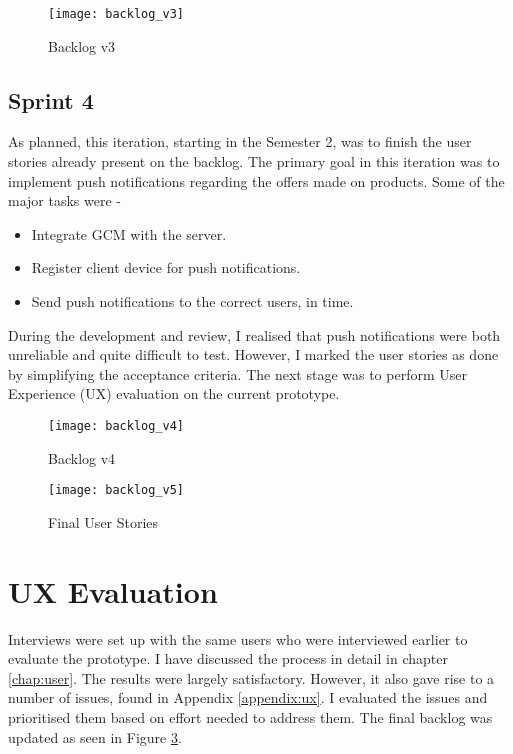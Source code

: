 \begin{figure}[!h]
    \centering
    \texttt{[image: backlog\_v3]}
    \caption{Backlog v3}\label{fig:backlog-v3}
\end{figure}

\subsection{Sprint 4}

As planned, this iteration, starting in the Semester 2, was to finish the user stories already present on the backlog. The primary goal in this iteration was to implement push notifications regarding the offers made on products. Some of the major tasks were - 

\begin{itemize}
	\item Integrate GCM with the server.
	\item Register client device for push notifications.
	\item Send push notifications to the correct users, in time.
\end{itemize}

During the development and review, I realised that push notifications were both unreliable and quite difficult to test. However, I marked the user stories as done by simplifying the acceptance criteria. The next stage was to perform User Experience (UX) evaluation on the current prototype.

\begin{figure}[!h]
    \centering
    \texttt{[image: backlog\_v4]}
    \caption{Backlog v4}\label{fig:backlog-v4}
\end{figure}

\begin{figure}[!h]
    \centering
    \texttt{[image: backlog\_v5]}
    \caption{Final User Stories}\label{fig:backlog-v5}
\end{figure}

\section{UX Evaluation}

Interviews were set up with the same users who were interviewed earlier to evaluate the prototype. I have discussed the process in detail in chapter \ref{chap:user}. The results were largely satisfactory. However, it also gave rise to a number of issues, found in Appendix \ref{appendix:ux}. I evaluated the issues and prioritised them based on effort needed to address them. The final backlog was updated as seen in Figure \ref{fig:backlog-v5}.

